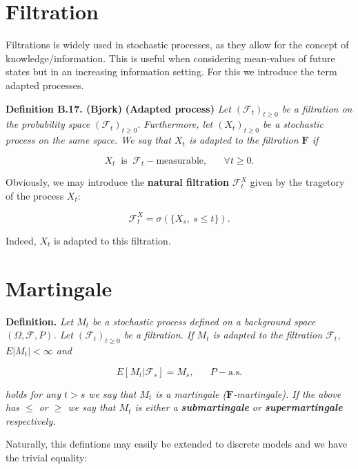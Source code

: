 \documentclass[a4paper,12pt,openany]{book}
\begin{document}
\hypertarget{filtration}{%
\section{Filtration}\label{filtration}}

Filtrations is widely used in stochastic processes, as they allow for the concept of knowledge/information. This is useful when considering mean-values of future states but in an increasing information setting. For this we introduce the term adapted processes.

\textbf{Definition B.17. (Bjork)} \textbf{(Adapted process)} \emph{Let \((\mathcal{F}_t)_{t\ge 0}\) be a filtration on the probability space \((\mathcal{F}_t)_{t\ge 0}\). Furthermore, let \((X_t)_{t\ge 0}\) be a stochastic process on the same space. We say that \(X_t\) is adapted to the filtration \(\mathbf{F}\) if}

\[
X_t\ \text{ is }\ \mathcal{F}_t-\text{measurable},\hspace{20pt}\forall t\ge 0.
\]

Obviously, we may introduce the \textbf{natural filtration} \(\mathcal{F}^X_t\) given by the tragetory of the process \(X_t\):

\[
\mathcal{F}^X_t=\sigma(\{X_s,\ s\le t\}).
\]

Indeed, \(X_t\) is adapted to this filtration.

\hypertarget{martingale}{%
\section{Martingale}\label{martingale}}

\textbf{Definition.} \emph{Let \(M_t\) be a stochastic process defined on a background space \((\Omega,\mathcal{F},P)\). Let \((\mathcal{F}_t)_{t\ge 0}\) be a filtration. If \(M_t\) is adapted to the filtration \(\mathcal{F}_t\), \(E\vert M_t\vert <\infty\) and}

\[
E[M_t\vert \mathcal{F}_s]=M_s,\hspace{20pt}P-\text{a.s.}
\]

\emph{holds for any \(t>s\) we say that \(M_t\) is a martingale (\(\mathbf{F}\)-martingale). If the above has \(\le\) or \(\ge\) we say that \(M_t\) is either a \textbf{submartingale} or \textbf{supermartingale} respectively.}

Naturally, this defintions may easily be extended to discrete models and we have the trivial equality:
\end{document}
